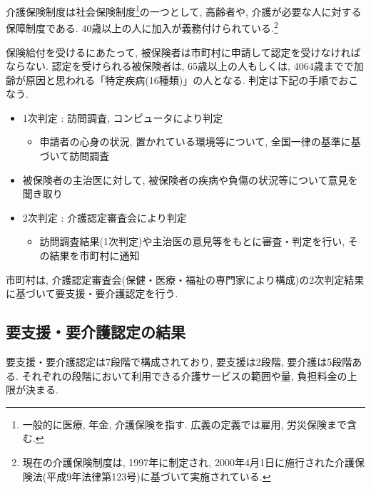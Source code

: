 介護保険制度は社会保険制度\footnote{一般的に医療, 年金, 介護保険を指す. 広義の定義では雇用, 労災保険まで含む.
}の一つとして,
高齢者や, 介護が必要な人に対する保障制度である.
40歳以上の人に加入が義務付けられている.\footnote{
	現在の介護保険制度は, 1997年に制定され, 2000年4月1日に施行された介護保険法(平成9年法律第123号)に基づいて実施されている.
}


保険給付を受けるにあたって, 被保険者は市町村に申請して認定を受けなければならない.
認定を受けられる被保険者は, 65歳以上の人もしくは, 4064歳までで加齢が原因と思われる「特定疾病(16種類)」の人となる.
判定は下記の手順でおこなう.
\begin{itemize} \setlength{\itemsep}{-0.5mm} \setlength{\parskip}{-0.5mm}
	\item 1次判定  :  訪問調査, コンピュータにより判定
	      \begin{itemize} \setlength{\itemsep}{-0.5mm} \setlength{\parskip}{-0.5mm}
		      \item 申請者の心身の状況, 置かれている環境等について, 全国一律の基準に基づいて訪問調査
	      \end{itemize}
	\item 被保険者の主治医に対して, 被保険者の疾病や負傷の状況等について意見を聞き取り
	\item 2次判定  :  介護認定審査会により判定
	      \begin{itemize} \setlength{\itemsep}{-0.5mm} \setlength{\parskip}{-0.5mm}
		      \item 訪問調査結果(1次判定)や主治医の意見等をもとに審査・判定を行い, その結果を市町村に通知
	      \end{itemize}
\end{itemize}
市町村は, 介護認定審査会(保健・医療・福祉の専門家により構成)の2次判定結果に基づいて要支援・要介護認定を行う.

\subsection{要支援・要介護認定の結果}
要支援・要介護認定は7段階で構成されており,  要支援は2段階, 要介護は5段階ある.
それぞれの段階において利用できる介護サービスの範囲や量, 負担料金の上限が決まる.

